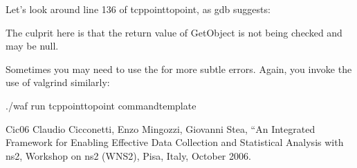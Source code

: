 \documentclass[letterpaper,10pt,english]{sphinxmanual}
\begin{document}
Let’s look around line 136 of tcp\sphinxhyphen{}point\sphinxhyphen{}to\sphinxhyphen{}point, as gdb suggests:

\begin{sphinxVerbatim}[commandchars=\\\{\}]
    
    
 
\end{sphinxVerbatim}

The culprit here is that the return value of GetObject is not being checked and
may be null.

Sometimes you may need to use the  for more subtle errors. Again, you invoke the use of
valgrind similarly:

\begin{sphinxVerbatim}[commandchars=\\\{\}]
\PYGZdl{} ./waf \PYGZhy{}\PYGZhy{}run tcp\PYGZhy{}point\PYGZhy{}to\PYGZhy{}point \PYGZhy{}\PYGZhy{}command\PYGZhy{}template
\end{sphinxVerbatim}

\begin{sphinxthebibliography}{Cic06}
Claudio Cicconetti, Enzo Mingozzi, Giovanni Stea, “An Integrated
Framework for Enabling Effective Data Collection and Statistical
Analysis with ns2, Workshop on ns\sphinxhyphen{}2 (WNS2), Pisa, Italy, October 2006.
\end{sphinxthebibliography}



\renewcommand{\indexname}{Index}
\printindex
\end{document}
